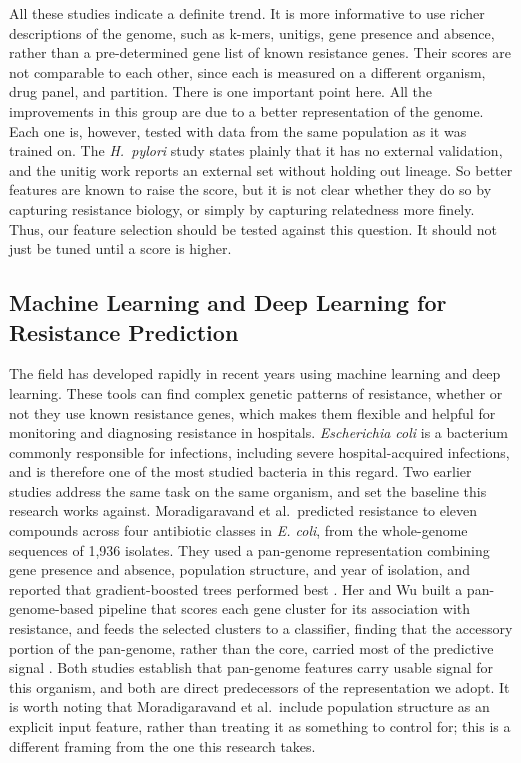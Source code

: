 \vspace{1em}

All these studies indicate a definite trend. It is more informative to use richer descriptions of the genome, such as k-mers, unitigs, gene presence and absence, rather than a pre-determined gene list of known resistance genes. Their scores are not comparable to each other, since each is measured on a different organism, drug panel, and partition. There is one important point here. All the improvements in this group are due to a better representation of the genome. Each one is, however, tested with data from the same population as it was trained on. The \textit{H.\ pylori} study states plainly that it has no external validation, and the unitig work reports an external set without holding out lineage. So better features are known to raise the score, but it is not clear whether they do so by capturing resistance biology, or simply by capturing relatedness more finely. Thus, our feature selection should be tested against this question. It should not just be tuned until a score is higher.

\subsection{Machine Learning and Deep Learning for Resistance Prediction}

The field has developed rapidly in recent years using machine learning and deep learning. These tools can find complex genetic patterns of resistance, whether or not they use known resistance genes, which makes them flexible and helpful for monitoring and diagnosing resistance in hospitals. \textit{Escherichia coli} is a bacterium commonly responsible for infections, including severe hospital-acquired infections, and is therefore one of the most studied bacteria in this regard. Two earlier studies address the same task on the same organism, and set the baseline this research works against. Moradigaravand et al.\ predicted resistance to eleven compounds across four antibiotic classes in \textit{E. coli}, from the whole-genome sequences of 1,936 isolates. They used a pan-genome representation combining gene presence and absence, population structure, and year of isolation, and reported that gradient-boosted trees performed best \cite{moradigaravand2018}. Her and Wu built a pan-genome-based pipeline that scores each gene cluster for its association with resistance, and feeds the selected clusters to a classifier, finding that the accessory portion of the pan-genome, rather than the core, carried most of the predictive signal \cite{her2018pangenome}. Both studies establish that pan-genome features carry usable signal for this organism, and both are direct predecessors of the representation we adopt. It is worth noting that Moradigaravand et al.\ include population structure as an explicit input feature, rather than treating it as something to control for; this is a different framing from the one this research takes.

